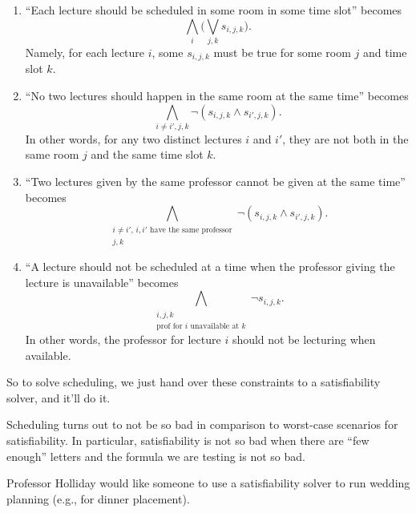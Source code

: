 \documentclass[../notes.tex]{subfiles}
\begin{document}
\begin{enumerate}
	\item ``Each lecture should be scheduled in some room in some time slot'' becomes
	\[\bigwedge_i\Bigg(\bigvee_{j,k}s_{i,j,k}\Bigg).\]
	Namely, for each lecture $i$, some $s_{i,j,k}$ must be true for some room $j$ and time slot $k$.
	\item ``No two lectures should happen in the same room at the same time'' becomes
	\[\bigwedge_{i\ne i',j,k}\lnot(s_{i,j,k}\land s_{i',j,k}).\]
	In other words, for any two distinct lectures $i$ and $i'$, they are not both in the same room $j$ and the same time slot $k$.
	\item ``Two lectures given by the same professor cannot be given at the same time'' becomes
	\[\bigwedge_{\substack{i\ne i',\,i,i'\text{ have the same professor}\\j,k}}\lnot(s_{i,j,k}\land s_{i',j,k}).\]
	\item ``A lecture should not be scheduled at a time when the professor giving the lecture is unavailable'' becomes
	\[\bigwedge_{\substack{i,j,k\\\text{prof for }i\text{ unavailable at }k}}\lnot s_{i,j,k}.\]
	In other words, the professor for lecture $i$ should not be lecturing when available.
\end{enumerate}
So to solve scheduling, we just hand over these constraints to a satisfiability solver, and it'll do it.
\begin{remark}
	Scheduling turns out to not be so bad in comparison to worst-case scenarios for satisfiability. In particular, satisfiability is not so bad when there are ``few enough'' letters and the formula we are testing is not so bad.
\end{remark}
\begin{remark}
	Professor Holliday would like someone to use a satisfiability solver to run wedding planning (e.g., for dinner placement).
\end{remark}
\end{document}
